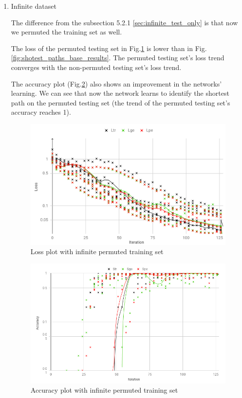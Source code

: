 \begin{enumerate}[label=(\Alph*)]

        \item Infinite dataset
        
        The difference from the subsection 5.2.1 \ref{sec:infinite_test_only} is that now we permuted the training set as well.
        
        The loss of the permuted testing set in Fig.\ref{fig:shotest_paths_train_perm_results} is lower than in Fig.\ref{fig:shotest_paths_base_results}. The permuted testing set's loss trend converges with the non-permuted testing set's loss trend.
        
        The accuracy plot (Fig.\ref{fig:shotest_paths_train_perm_ACC_results}) also shows an improvement in the networks' learning. We can see that now the network learns to identify the shortest path on the permuted testing set (the trend of the permuted testing set's accuracy reaches 1).
        
        \begin{figure}[H]
            \centering
            \includegraphics[width=.9\linewidth]{fig/content/results/shortest_path/training_perm.png}
            \caption{Loss plot with infinite permuted training set}
            \label{fig:shotest_paths_train_perm_results}
        \end{figure}
        
        \begin{figure}[H]
            \centering
            \includegraphics[width=.9\linewidth]{fig/content/results/shortest_path/training_perm_ACC.png}
            \caption{Accuracy plot with infinite permuted training set}
            \label{fig:shotest_paths_train_perm_ACC_results}
        \end{figure}
        

\end{enumerate}
